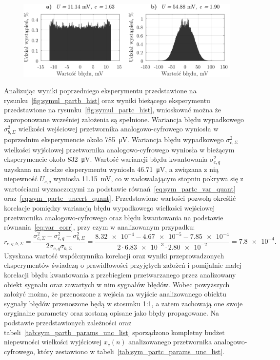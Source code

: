 \begin{figure}[htb!]
\begin{center}
\includegraphics{obrazki/hist_part_c}
\end{center}
\end{figure}

Analizując wyniki poprzedniego eksperymentu przedstawione na rysunku~\ref{fig:symul_partb_hist} oraz wyniki bieżącego eksperymentu przedstawione na rysunku~\ref{fig:symul_partc_hist}, wnioskować można że zaproponowane wcześniej założenia są spełnione. Wariancja błędu wypadkowego $\sigma_{b,\Sigma}^{2}$ wielkości wejściowej przetwornika analogowo-cyfrowego wyniosła w poprzednim eksperymencie około \qty{785}{\micro V}. Wariancja błędu wypadkowego $\sigma_{c,\Sigma}^{2}$ wielkości wyjściowej przetwornika analogowo-cyfrowego wyniosła w bieżącym eksperymencie około \qty{832}{\micro V}. Wartość wariancji błędu kwantowania $\sigma_{c,q}^{2}$ uzyskana na drodze eksperymentu wyniosła \qty{46.71}{\micro V}, a związana z nią niepewność $U_{c,q}$ wyniosła \qty{11.15}{mV}, co w zadowalającym stopniu pokrywa się z wartościami wyznaczonymi na podstawie równań~\eqref{eq:sym_partc_var_quant} oraz~\eqref{eq:sym_partc_uncert_quant}. Przedstawione wartości pozwolą określić korelacje pomiędzy wariancją błędu wypadkowego wielkości wejściowej przetwornika analogowo-cyfrowego oraz błędu kwantowania na podstawie równania~\eqref{eq:var_corr}, przy czym w analizowanym przypadku:
\begin{equation}
r_{c,q;b,\Sigma} = \frac{\sigma_{c,\Sigma}^{2} - \sigma_{c,q}^{2} - \sigma_{b,\Sigma}^{2}}{2 \sigma_{c,q} \sigma_{b,\Sigma}} = \frac{\num{8.32e-4} - \num{4.67e-5} - \num{7.85e-4}}{2 \cdot \num{6.83e-3} \cdot \num{2.80e-2}} = \num{7.8e-4} \label{eq:sym_partc_corr}.
\end{equation}
Uzyskana wartość współczynnika korelacji oraz wyniki przeprowadzonych eksperymentów świadczą o prawidłowości przyjętych założeń i pomijalnie małej korelacji błędu kwantowania z przebiegiem przetwarzanego przez analizowany obiekt sygnału oraz zawartych w nim sygnałów błędów. Wobec powyższych założyć można, że przenoszone z wejścia na wyjście analizowanego obiektu sygnały błędów przenoszone będą w stosunku 1:1, a zatem zachowają one swoje oryginalne parametry oraz zostaną opisane jako błędy propagowane. Na podstawie przedstawionych zależności oraz tabeli~\ref{tab:sym_partb_params_unc_list} sporządzono kompletny budżet niepewności wielkości wyjściowej $x_{c}(n)$ analizowanego przetwornika analogowo-cyfrowego, który zestawiono w tabeli~\ref{tab:sym_partc_params_unc_list}.


